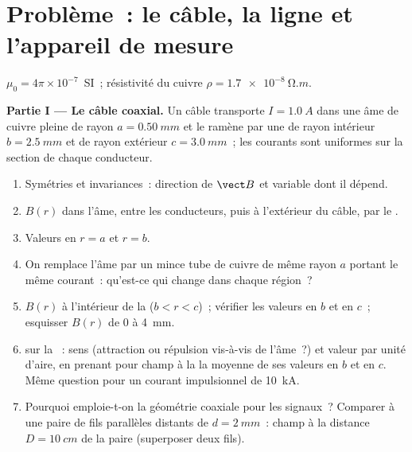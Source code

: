 \section{Problème~: le câble, la ligne et l'appareil de mesure}

\begin{problem}
\label{pb:b1:magnetostatics:1}
$\mu_0 = 4\pi \times 10^{-7}$~SI~; résistivité du cuivre $\rho = \qty{1.7e-8}{\ohm.m}$.

\medskip
\noindent\textbf{Partie I --- Le câble coaxial.}
Un câble transporte $I = \qty{1.0}{A}$ dans une âme de cuivre pleine de rayon
$a = \qty{0.50}{mm}$ et le ramène par une  de rayon intérieur $b =
\qty{2.5}{mm}$ et de rayon extérieur $c = \qty{3.0}{mm}$~; les courants sont
uniformes sur la section de chaque conducteur.
\begin{enumerate}
  \item Symétries et invariances~: direction de $\vect B$ et variable dont il
        dépend.
  \item $B(r)$ dans l'âme, entre les conducteurs, puis à l'extérieur du
        câble, par le .
  \item Valeurs en $r = a$ et $r = b$.
  \item On remplace l'âme par un mince tube de cuivre de même rayon
        $a$ portant le même courant~: qu'est-ce qui change dans chaque région~?
  \item $B(r)$ à l'intérieur de la  ($b < r < c$)~; vérifier les valeurs
        en $b$ et en $c$~; esquisser $B(r)$ de $0$ à \qty{4}{mm}.
  \item {} sur la ~: sens (attraction ou répulsion
        vis-à-vis de l'âme~?) et valeur par unité d'aire, en prenant pour
        champ à la  la moyenne de ses valeurs en $b$ et en $c$.
        Même question pour un courant impulsionnel de \qty{10}{kA}.
  \item Pourquoi emploie-t-on la géométrie coaxiale pour les signaux~?
        Comparer à une paire de fils parallèles distants de $d = \qty{2}{mm}$~:
        champ à la distance $D = \qty{10}{cm}$ de la paire (superposer deux fils).
\end{enumerate}


\end{problem}
